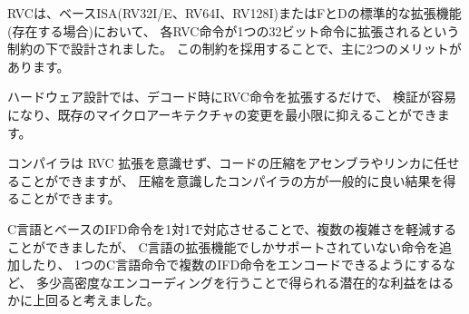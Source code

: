 \begin{comment}
RVC was designed under the constraint that each RVC instruction
expands into a single 32-bit instruction in either the base ISA
(RV32I/E, RV64I, or RV128I) or the F and D standard extensions where
present.  Adopting this constraint has two main benefits:
\end{comment}

RVCは、ベースISA(RV32I/E、RV64I、RV128I)またはFとDの標準的な拡張機能(存在する場合)において、
各RVC命令が1つの32ビット命令に拡張されるという制約の下で設計されました。
この制約を採用することで、主に2つのメリットがあります。

\begin{tightlist}
  \begin{comment}
\item Hardware designs can simply expand RVC instructions during
  decode, simplifying verification and minimizing modifications to
  existing microarchitectures.
  \end{comment}
\item ハードウェア設計では、デコード時にRVC命令を拡張するだけで、
  検証が容易になり、既存のマイクロアーキテクチャの変更を最小限に抑えることができます。
  \begin{comment}
\item Compilers can be unaware of the RVC extension and leave code
  compression to the assembler and linker, although a
  compression-aware compiler will generally be able to produce better
  results.
  \end{comment}
\item コンパイラは RVC 拡張を意識せず、コードの圧縮をアセンブラやリンカに任せることができますが、
  圧縮を意識したコンパイラの方が一般的に良い結果を得ることができます。
\end{tightlist}

\begin{commentary}
\begin{comment}
We felt the multiple complexity reductions of a simple one-one mapping
between C and base IFD instructions far outweighed the potential gains
of a slightly denser encoding that added additional instructions only
supported in the C extension, or that allowed encoding of multiple IFD
instructions in one C instruction.
\end{comment}
C言語とベースのIFD命令を1対1で対応させることで、複数の複雑さを軽減することができましたが、
C言語の拡張機能でしかサポートされていない命令を追加したり、
1つのC言語命令で複数のIFD命令をエンコードできるようにするなど、
多少高密度なエンコーディングを行うことで得られる潜在的な利益をはるかに上回ると考えました。
\end{commentary}

